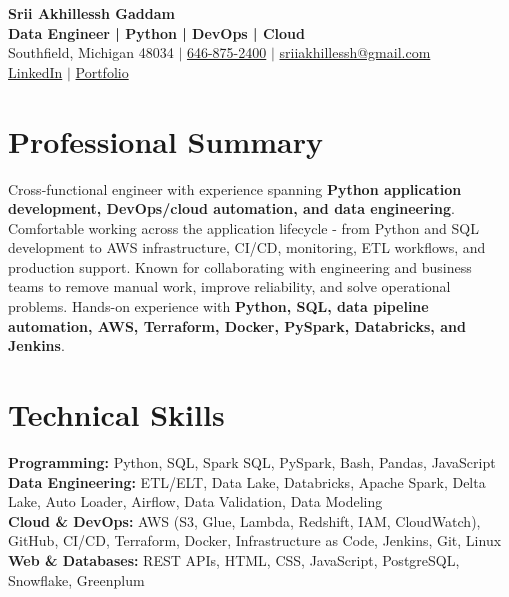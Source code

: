 \documentclass[letterpaper,10pt]{article}
\begin{document}
\fontsize{9.35pt}{10.45pt}\selectfont

\begin{center}
    {\LARGE \textbf{Srii Akhillessh Gaddam}} \\[-1pt]
    \textbf{Data Engineer | Python | DevOps | Cloud} \\[2pt]
    Southfield, Michigan 48034 $|$
    \href{tel:6468752400}{646-875-2400} $|$
    \href{mailto:sriiakhillessh@gmail.com}{sriiakhillessh@gmail.com} \\[1pt]
    \href{https://www.linkedin.com/in/srii-akhiilessh-gaddam-b48668191/}{LinkedIn} $|$
    \href{https://sriiakhillesshg.github.io/portfolio/}{Portfolio}
\end{center}
\vspace{-8pt}

\section{Professional Summary}
\small{Cross-functional engineer with experience spanning \textbf{Python application development, DevOps/cloud automation, and data engineering}. Comfortable working across the application lifecycle - from Python and SQL development to AWS infrastructure, CI/CD, monitoring, ETL workflows, and production support. Known for collaborating with engineering and business teams to remove manual work, improve reliability, and solve operational problems. Hands-on experience with \textbf{Python, SQL, data pipeline automation, AWS, Terraform, Docker, PySpark, Databricks, and Jenkins}.}

\section{Technical Skills}
\small{
\textbf{Programming:} Python, SQL, Spark SQL, PySpark, Bash, Pandas, JavaScript \\
\textbf{Data Engineering:} ETL/ELT, Data Lake, Databricks, Apache Spark, Delta Lake, Auto Loader, Airflow, Data Validation, Data Modeling \\
\textbf{Cloud \& DevOps:} AWS (S3, Glue, Lambda, Redshift, IAM, CloudWatch), GitHub, CI/CD, Terraform, Docker, Infrastructure as Code, Jenkins, Git, Linux \\
\textbf{Web \& Databases:} REST APIs, HTML, CSS, JavaScript, PostgreSQL, Snowflake, Greenplum
}
\end{document}
